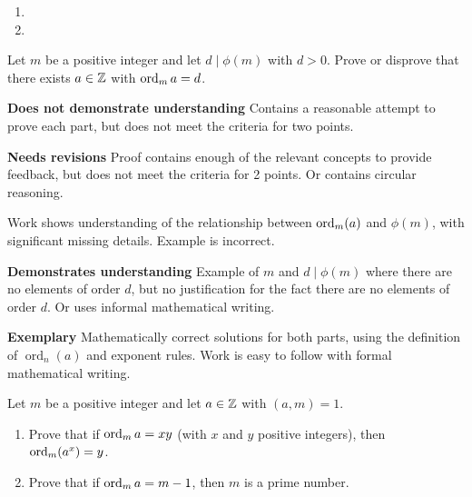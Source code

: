 \documentclass[letterpaper, 11pt]{../ximera}
\begin{document}
\begin{solution}
 	\begin{enumerate}[label=(\alph*)]
 		\item
		\item 
	\end{enumerate}

\end{solution}
	
\begin{ex}
	Let $m$ be a positive integer and let $d\mid \phi(m)$ with $d>0$. Prove or disprove that there exists $a\in\mathbb Z$ with $\operatorname{ord}_m a=d$.
\end{ex}

\begin{writeRubric}
    \item \textbf{Does not demonstrate understanding}
     Contains a reasonable attempt to prove each part, but does not meet the criteria for two points.
     
    \item \textbf{Needs revisions}
    Proof contains enough of the relevant concepts to provide feedback, but does not meet the criteria for 2 points. Or contains circular reasoning.
 \item Work shows understanding of the relationship between $\operatorname{ord}_m (a)$ and $\phi(m)$, with significant missing details. Example is incorrect.
     
    \item \textbf{Demonstrates understanding}
    Example of $m$ and $d\mid\phi(m)$ where there are no elements of order $d$, but no justification for the fact there are no elements of order $d$.
 Or uses informal mathematical writing.

    \item \textbf{Exemplary}
       Mathematically correct solutions for both parts, using the definition of $\operatorname{ord}_n(a)$ and exponent rules. Work is easy to follow with formal mathematical writing.
\end{writeRubric}
                                       	
\begin{solution}
 
\end{solution}

\begin{ex} Let $m$ be a positive integer and let $a\in\mathbb Z$ with $(a,m)=1$.
	\begin{enumerate}[label=(\alph*)]
 		\item Prove that if $\operatorname{ord}_m a= xy$ (with $x$ and $y$ positive integers), then $\operatorname{ord}_m(a^x)=y$.
		\item Prove that if $\operatorname{ord}_m a =m-1$, then $m$ is a prime number.
	\end{enumerate}
\end{ex}
\end{document}
